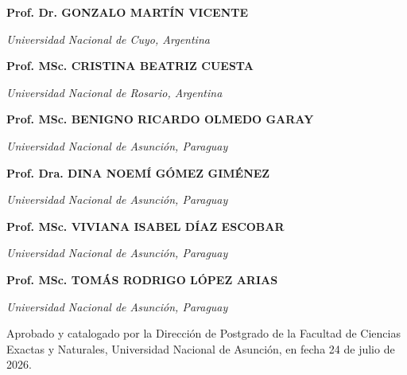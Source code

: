\documentclass[12pt,a4paper,oneside]{book}
\begin{document}

\textbf{Prof. Dr. GONZALO MARTÍN VICENTE} \par
\vspace{-0.25cm}
\textit{Universidad Nacional de Cuyo, Argentina} \par
\vspace{0.25cm}

\textbf{Prof. MSc. CRISTINA BEATRIZ CUESTA} \par
\vspace{-0.25cm}
\textit{Universidad Nacional de Rosario, Argentina} \par
\vspace{0.25cm}

\textbf{Prof. MSc. BENIGNO RICARDO OLMEDO GARAY} \par
\vspace{-0.25cm}
\textit{Universidad Nacional de Asunción, Paraguay} \par
\vspace{0.25cm}

\textbf{Prof. Dra. DINA NOEMÍ GÓMEZ GIMÉNEZ} \par
\vspace{-0.25cm}
\textit{Universidad Nacional de Asunción, Paraguay} \par
\vspace{0.25cm}

\textbf{Prof. MSc. VIVIANA ISABEL DÍAZ ESCOBAR} \par
\vspace{-0.25cm}
\textit{Universidad Nacional de Asunción, Paraguay} \par
\vspace{0.25cm}

\textbf{Prof. MSc. TOMÁS RODRIGO LÓPEZ ARIAS} \par
\vspace{-0.25cm}
\textit{Universidad Nacional de Asunción, Paraguay} \par

\vfill %

\vspace{1cm}
Aprobado y catalogado por la Dirección de Postgrado de la Facultad de Ciencias Exactas y Naturales, Universidad Nacional de Asunción, en fecha 24 de julio de 2026.
\endgroup

\vspace{1cm}
\end{document}
